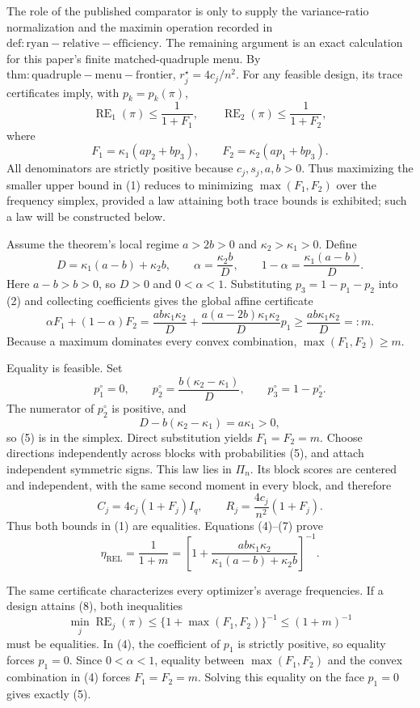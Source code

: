 The role of the published comparator is only to supply the variance-ratio normalization and the maximin operation recorded in \(\mathrm{def:ryan-relative-efficiency}\). The remaining argument is an exact calculation for this paper's finite matched-quadruple menu. By \(\mathrm{thm:quadruple-menu-frontier}\), \(r_j^\star=4c_j/n^2\). For any feasible design, its trace certificates imply, with \(p_k=p_k(\pi)\),
\[
\operatorname{RE}_1(\pi)\le\frac1{1+F_1},
\qquad
\operatorname{RE}_2(\pi)\le\frac1{1+F_2}, \tag{1}
\]
where
\[
F_1=\kappa_1(ap_2+bp_3),
\qquad
F_2=\kappa_2(ap_1+bp_3). \tag{2}
\]
All denominators are strictly positive because \(c_j,s_j,a,b>0\). Thus maximizing the smaller upper bound in (1) reduces to minimizing \(\max(F_1,F_2)\) over the frequency simplex, provided a law attaining both trace bounds is exhibited; such a law will be constructed below.

Assume the theorem's local regime \(a>2b>0\) and \(\kappa_2>\kappa_1>0\). Define
\[
D=\kappa_1(a-b)+\kappa_2b,
\qquad
\alpha=\frac{\kappa_2b}{D},
\qquad
1-\alpha=\frac{\kappa_1(a-b)}D. \tag{3}
\]
Here \(a-b>b>0\), so \(D>0\) and \(0<\alpha<1\). Substituting \(p_3=1-p_1-p_2\) into (2) and collecting coefficients gives the global affine certificate
\[
\alpha F_1+(1-\alpha)F_2
=\frac{ab\kappa_1\kappa_2}{D}
+\frac{a(a-2b)\kappa_1\kappa_2}{D}p_1
\ge \frac{ab\kappa_1\kappa_2}{D}=:m. \tag{4}
\]
Because a maximum dominates every convex combination, \(\max(F_1,F_2)\ge m\).

Equality is feasible. Set
\[
p_1^\circ=0,
\qquad
p_2^\circ=\frac{b(\kappa_2-\kappa_1)}D,
\qquad
p_3^\circ=1-p_2^\circ. \tag{5}
\]
The numerator of \(p_2^\circ\) is positive, and
\[
D-b(\kappa_2-\kappa_1)=a\kappa_1>0, \tag{6}
\]
so (5) is in the simplex. Direct substitution yields \(F_1=F_2=m\). Choose directions independently across blocks with probabilities (5), and attach independent symmetric signs. This law lies in \(\Pi_n\). Its block scores are centered and independent, with the same second moment in every block, and therefore
\[
C_j=4c_j(1+F_j)I_q,
\qquad
R_j=\frac{4c_j}{n^2}(1+F_j). \tag{7}
\]
Thus both bounds in (1) are equalities. Equations (4)--(7) prove
\[
\eta_{\mathrm{REL}}
=\frac1{1+m}
=\left[1+\frac{ab\kappa_1\kappa_2}{\kappa_1(a-b)+\kappa_2b}\right]^{-1}. \tag{8}
\]

The same certificate characterizes every optimizer's average frequencies. If a design attains (8), both inequalities
\[
\min_j\operatorname{RE}_j(\pi)
\le\{1+\max(F_1,F_2)\}^{-1}
\le(1+m)^{-1} \tag{9}
\]
must be equalities. In (4), the coefficient of \(p_1\) is strictly positive, so equality forces \(p_1=0\). Since \(0<\alpha<1\), equality between \(\max(F_1,F_2)\) and the convex combination in (4) forces \(F_1=F_2=m\). Solving this equality on the face \(p_1=0\) gives exactly (5).

